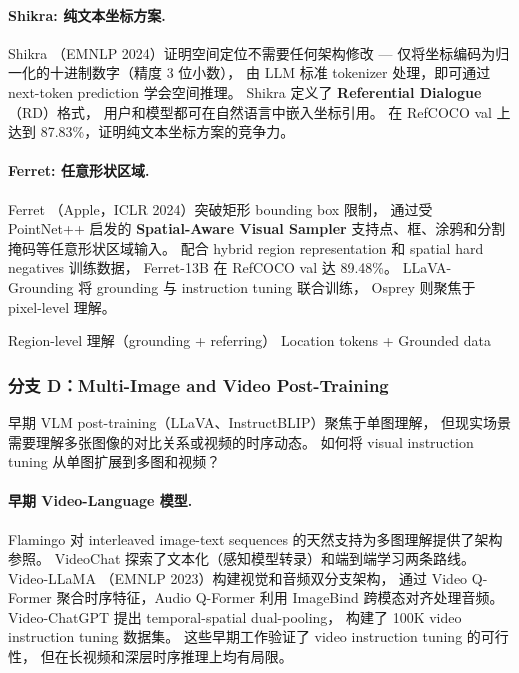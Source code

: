 \paragraph{Shikra: 纯文本坐标方案.}
Shikra \cite{chen2023shikra}（EMNLP 2024）证明空间定位不需要任何架构修改 ---
仅将坐标编码为归一化的十进制数字（精度 3 位小数），
由 LLM 标准 tokenizer 处理，即可通过 next-token prediction 学会空间推理。
Shikra 定义了 \textbf{Referential Dialogue}（RD）格式，
用户和模型都可在自然语言中嵌入坐标引用。
在 RefCOCO val 上达到 87.83\%，证明纯文本坐标方案的竞争力。

\paragraph{Ferret: 任意形状区域.}
Ferret \cite{you2023ferret}（Apple，ICLR 2024）突破矩形 bounding box 限制，
通过受 PointNet++ 启发的 \textbf{Spatial-Aware Visual Sampler}
支持点、框、涂鸦和分割掩码等任意形状区域输入。
配合 hybrid region representation 和 spatial hard negatives 训练数据，
Ferret-13B 在 RefCOCO val 达 89.48\%。
LLaVA-Grounding \cite{zhang2023llava-grounding} 将 grounding 与 instruction tuning 联合训练，
Osprey \cite{yuan2023osprey} 则聚焦于 pixel-level 理解。

  {Region-level 理解（grounding + referring）}
  {Location tokens + Grounded data}

\subsubsection{分支 D：Multi-Image and Video Post-Training}
\label{sec:t5-branch-d}

\begin{problembox}
早期 VLM post-training（LLaVA、InstructBLIP）聚焦于单图理解，
但现实场景需要理解多张图像的对比关系或视频的时序动态。
如何将 visual instruction tuning 从单图扩展到多图和视频？
\end{problembox}

\paragraph{早期 Video-Language 模型.}
Flamingo 对 interleaved image-text sequences 的天然支持为多图理解提供了架构参照。
VideoChat \cite{li2023videochat} 探索了文本化（感知模型转录）和端到端学习两条路线。
Video-LLaMA \cite{zhang2023videollama}（EMNLP 2023）构建视觉和音频双分支架构，
通过 Video Q-Former 聚合时序特征，Audio Q-Former 利用 ImageBind 跨模态对齐处理音频。
Video-ChatGPT \cite{maaz2023videochatgpt} 提出 temporal-spatial dual-pooling，
构建了 100K video instruction tuning 数据集。
这些早期工作验证了 video instruction tuning 的可行性，
但在长视频和深层时序推理上均有局限。

